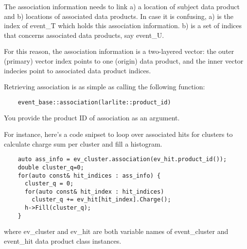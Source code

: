 The association information needs to link a) a location of subject data product and b) locations of associated data products.
In case it is confusing, a) is the index of {\ttfamily event\_T} which holds this association information.
b) is a set of indices that concerns associated data products, say {\ttfamily event\_U}.

For this reason, the association information is a two-layered vector: the outer (primary) vector index points to one (origin) data product, and the inner vector indecies point to associated data product indices. 

Retrieving association is as simple as calling the following function:
\begin{lstlisting}
    event_base::association(larlite::product_id)
\end{lstlisting}
You provide the product ID of association as an argument.

For instance, here's a code snipset to loop over associated hits for clusters to calculate charge sum per cluster and fill a histogram.
\begin{lstlisting}
    auto ass_info = ev_cluster.association(ev_hit.product_id());
    double cluster_q=0;
    for(auto const& hit_indices : ass_info) {
      cluster_q = 0;
      for(auto const& hit_index : hit_indices)
        cluster_q += ev_hit[hit_index].Charge();
      h->Fill(cluster_q);
    }
\end{lstlisting}
where {\ttfamily ev\_cluster} and {\ttfamily ev\_hit} are both variable names of {\ttfamily event\_cluster} and {\ttfamily event\_hit} data product class instances. 
